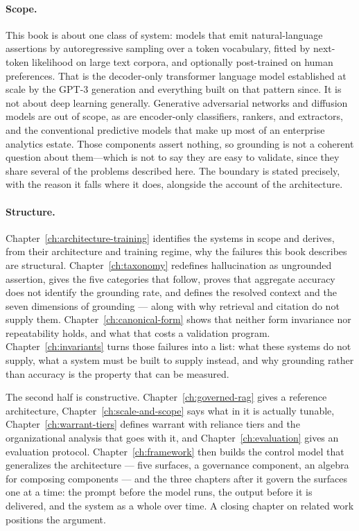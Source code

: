 \paragraph{Scope.} This book is about one class of system: models that emit
natural-language assertions by autoregressive sampling over a token vocabulary,
fitted by next-token likelihood on large text corpora, and optionally post-trained
on human preferences. That is the decoder-only transformer language model
established at scale by the GPT-3 generation and everything built on that pattern
since. It is not about deep learning generally. Generative adversarial networks and
diffusion models are out of scope, as are encoder-only classifiers, rankers, and
extractors, and the conventional predictive models that make up most of an
enterprise analytics estate. Those components assert nothing, so grounding is not a
coherent question about them---which is not to say they are easy to validate,
since they share several of the problems described here. The boundary is stated
precisely, with the reason it falls where it does, alongside the account of the
architecture.

\paragraph{Structure.} Chapter~\ref{ch:architecture-training} identifies the
systems in scope and derives, from their architecture and training regime, why the
failures this book describes are structural. Chapter~\ref{ch:taxonomy} redefines
hallucination as ungrounded assertion, gives the five categories that follow,
proves that aggregate accuracy does not identify the grounding rate, and defines
the resolved context and the seven dimensions of grounding --- along with why
retrieval and citation do not supply them.
Chapter~\ref{ch:canonical-form} shows that neither form invariance nor
repeatability holds, and what that costs a validation program.
Chapter~\ref{ch:invariants} turns those failures into a list: what these systems do
not supply, what a system must be built to supply instead, and why grounding rather
than accuracy is the property that can be measured.

The second half is constructive. Chapter~\ref{ch:governed-rag} gives a reference
architecture, Chapter~\ref{ch:scale-and-scope} says what in it is actually tunable,
Chapter~\ref{ch:warrant-tiers} defines warrant with reliance tiers and the
organizational analysis that goes with it, and Chapter~\ref{ch:evaluation} gives an
evaluation protocol. Chapter~\ref{ch:framework} then builds the control model that
generalizes the architecture --- five surfaces, a governance component, an algebra
for composing components --- and the three chapters after it govern the surfaces one
at a time: the prompt before the model runs, the output before it is delivered, and
the system as a whole over time. A closing chapter on related work positions the
argument.


